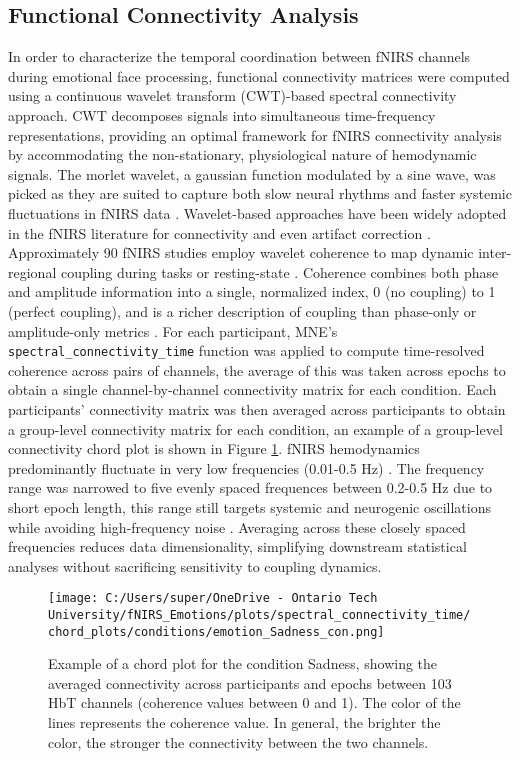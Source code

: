 \subsection{Functional Connectivity Analysis}
\label{sec:connectivity_analysis}
In order to characterize the temporal coordination between fNIRS channels during emotional face processing, functional connectivity matrices were computed using a continuous wavelet transform (CWT)-based spectral connectivity approach.
CWT decomposes signals into simultaneous time-frequency representations, providing an optimal framework for fNIRS connectivity analysis by accommodating the non-stationary, physiological nature of hemodynamic signals. 
The morlet wavelet, a gaussian function modulated by a sine wave, was picked as they are suited to capture both slow neural rhythms and faster systemic fluctuations in fNIRS data \citep{reddy_evaluation_2021}. 
Wavelet-based approaches have been widely adopted in the fNIRS literature for connectivity and even artifact correction \citep{bergmann_evaluation_2023}. 
Approximately 90 fNIRS studies employ wavelet coherence to map dynamic inter-regional coupling during tasks or resting-state \citep{hakim_quantification_2023}.
Coherence combines both phase and amplitude information into a single, normalized index, 0 (no coupling) to 1 (perfect coupling), and is a richer description of coupling than phase-only or amplitude-only metrics \citep{bastos_tutorial_2016}.
For each participant, MNE's \texttt{spectral\_connectivity\_time} function was applied to compute time-resolved coherence across pairs of channels, the average of this was taken across epochs to obtain a single channel-by-channel connectivity matrix for each condition.
Each participants' connectivity matrix was then averaged across participants to obtain a group-level connectivity matrix for each condition, an example of a group-level connectivity chord plot is shown in Figure \ref{fig:chord_plot}.
fNIRS hemodynamics predominantly fluctuate in very low frequencies (0.01-0.5 Hz) \citep{reddy_evaluation_2021}. 
The frequency range was narrowed to five evenly spaced frequences between 0.2-0.5 Hz due to short epoch length, this range still targets systemic and neurogenic oscillations while avoiding high-frequency noise \citep{xu_functional_2017}.
Averaging across these closely spaced frequencies reduces data dimensionality, simplifying downstream statistical analyses without sacrificing sensitivity to coupling dynamics. 

\begin{figure}[H]
    \centering
    \texttt{[image: C:/Users/super/OneDrive - Ontario Tech University/fNIRS\_Emotions/plots/spectral\_connectivity\_time/chord\_plots/conditions/emotion\_Sadness\_con.png]}
    \caption{Example of a chord plot for the condition Sadness, showing the averaged connectivity across participants and epochs between 103 HbT channels (coherence values between 0 and 1).
    The color of the lines represents the coherence value. 
    In general, the brighter the color, the stronger the connectivity between the two channels.}
    \label{fig:chord_plot}
\end{figure}

